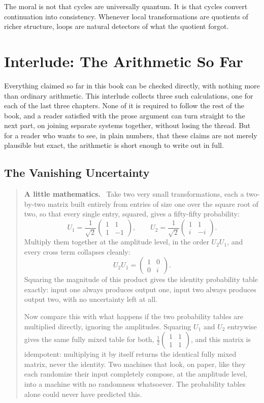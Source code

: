 \documentclass[12pt,openany]{book}
\newenvironment{lowmath}{\begin{quote}\small\noindent\textbf{A little mathematics.}\ }{\end{quote}}
\begin{document}
The moral is not that cycles are universally quantum. It is that cycles convert continuation into consistency. Whenever local transformations are quotients of richer structure, loops are natural detectors of what the quotient forgot.

\chapter{Interlude: The Arithmetic So Far}

Everything claimed so far in this book can be checked directly, with nothing more than ordinary arithmetic. This interlude collects three such calculations, one for each of the last three chapters. None of it is required to follow the rest of the book, and a reader satisfied with the prose argument can turn straight to the next part, on joining separate systems together, without losing the thread. But for a reader who wants to see, in plain numbers, that these claims are not merely plausible but exact, the arithmetic is short enough to write out in full.

\section{The Vanishing Uncertainty}

\begin{lowmath}
Take two very small transformations, each a two-by-two matrix built entirely from entries of size one over the square root of two, so that every single entry, squared, gives a fifty-fifty probability:
\[
U_1=\frac{1}{\sqrt2}\begin{pmatrix}1&1\\1&-1\end{pmatrix},\qquad
U_2=\frac{1}{\sqrt2}\begin{pmatrix}1&1\\i&-i\end{pmatrix}.
\]
Multiply them together at the amplitude level, in the order $U_2U_1$, and every cross term collapses cleanly:
\[
U_2U_1=\begin{pmatrix}1&0\\0&i\end{pmatrix}.
\]
Squaring the magnitude of this product gives the identity probability table exactly: input one always produces output one, input two always produces output two, with no uncertainty left at all.

Now compare this with what happens if the two probability tables are multiplied directly, ignoring the amplitudes. Squaring $U_1$ and $U_2$ entrywise gives the same fully mixed table for both, $\tfrac12\begin{pmatrix}1&1\\1&1\end{pmatrix}$, and this matrix is idempotent: multiplying it by itself returns the identical fully mixed matrix, never the identity. Two machines that look, on paper, like they each randomize their input completely compose, at the amplitude level, into a machine with no randomness whatsoever. The probability tables alone could never have predicted this.
\end{lowmath}
\end{document}
